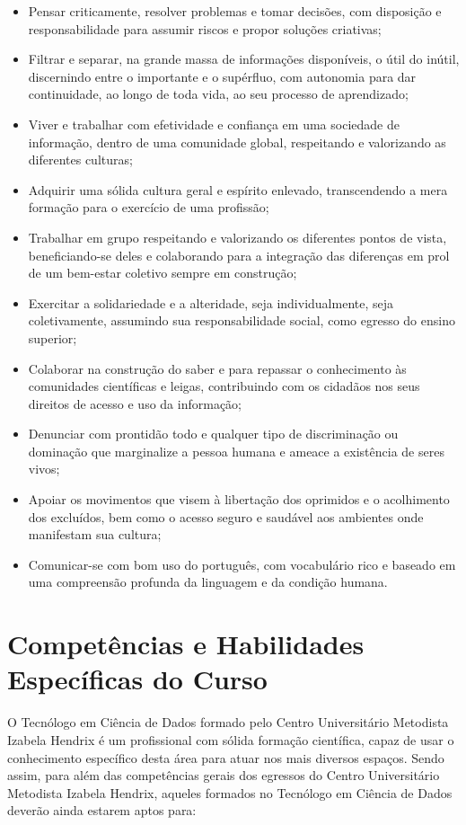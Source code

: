 \documentclass[a4paper, 12pt, openright, oneside, german, french, english, brazil]{abntex2}
\begin{document}
\begin{itemize}
\item Pensar criticamente, resolver problemas e tomar decisões, com disposição e responsabilidade para assumir riscos e propor soluções criativas;
\item Filtrar e separar, na grande massa de informações disponíveis, o útil do inútil, discernindo entre o importante e o supérfluo, com autonomia para dar continuidade, ao longo de toda vida, ao seu processo de aprendizado;
\item Viver e trabalhar com efetividade e confiança em uma sociedade de informação, dentro de uma comunidade global, respeitando e valorizando as diferentes culturas;
\item Adquirir uma sólida cultura geral e espírito enlevado, transcendendo a mera formação para o exercício de uma profissão;
\item Trabalhar em grupo respeitando e valorizando os diferentes pontos de vista, beneficiando-se deles e colaborando para a integração das diferenças em prol de um bem-estar coletivo sempre em construção;
\item Exercitar a solidariedade e a alteridade, seja individualmente, seja coletivamente, assumindo sua responsabilidade social, como egresso do ensino superior;
\item Colaborar na construção do saber e para repassar o conhecimento às comunidades científicas e leigas, contribuindo com os cidadãos nos seus direitos de acesso e uso da informação;
\item Denunciar com prontidão todo e qualquer tipo de discriminação ou dominação que marginalize a pessoa humana e ameace a existência de seres vivos;
\item Apoiar os movimentos que visem à libertação dos oprimidos e o acolhimento dos excluídos, bem como o acesso seguro e saudável aos ambientes onde manifestam sua cultura;
\item Comunicar-se com bom uso do português, com vocabulário rico e baseado em uma compreensão profunda da linguagem e da condição humana.
\end{itemize}

\section{Competências e Habilidades Específicas do Curso}

O Tecnólogo em Ciência de Dados formado pelo Centro Universitário Metodista Izabela Hendrix é um profissional com sólida formação científica, capaz de usar o conhecimento específico desta área para atuar nos mais diversos espaços. Sendo assim, para além das competências gerais dos egressos do Centro Universitário Metodista Izabela Hendrix, aqueles formados no Tecnólogo em Ciência de Dados deverão ainda estarem aptos para:
\end{document}
